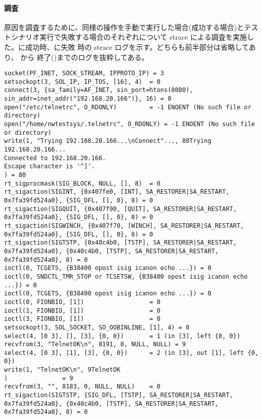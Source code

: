     \paragraph{調査}

原因を調査するために、同様の操作を手動で実行した場合(成功する場合)とテス
トシナリオ実行で失敗する場合のそれぞれについて strace による調査を実施し
た。に成功時、に失敗
時の strace ログを示す。どちらも前半部分は省略してあり、
から 終了()までのログを抜粋してある。

\begin{lstlisting}[caption=Telnet成功時(手動),label=lst:telnet-success,linebackgroundcolor={\ifnum\value{lstnumber}>22 \ifnum\value{lstnumber}<29\color{green!30}\fi\fi}]
socket(PF_INET, SOCK_STREAM, IPPROTO_IP) = 3
setsockopt(3, SOL_IP, IP_TOS, [16], 4)  = 0
connect(3, {sa_family=AF_INET, sin_port=htons(8080), sin_addr=inet_addr("192.168.20.166")}, 16) = 0
open("/etc/telnetrc", O_RDONLY)         = -1 ENOENT (No such file or directory)
open("/home/nwtestsys/.telnetrc", O_RDONLY) = -1 ENOENT (No such file or directory)
write(1, "Trying 192.168.20.166...\nConnect"..., 80Trying 192.168.20.166...
Connected to 192.168.20.166.
Escape character is '^]'.
) = 80
rt_sigprocmask(SIG_BLOCK, NULL, [], 8)  = 0
rt_sigaction(SIGINT, {0x407fe0, [INT], SA_RESTORER|SA_RESTART, 0x7fa39fd524a0}, {SIG_DFL, [], 0}, 8) = 0
rt_sigaction(SIGQUIT, {0x407f90, [QUIT], SA_RESTORER|SA_RESTART, 0x7fa39fd524a0}, {SIG_DFL, [], 0}, 8) = 0
rt_sigaction(SIGWINCH, {0x407f70, [WINCH], SA_RESTORER|SA_RESTART, 0x7fa39fd524a0}, {SIG_DFL, [], 0}, 8) = 0
rt_sigaction(SIGTSTP, {0x40c4b0, [TSTP], SA_RESTORER|SA_RESTART, 0x7fa39fd524a0}, {0x40c4b0, [TSTP], SA_RESTORER|SA_RESTART, 0x7fa39fd524a0}, 8) = 0
ioctl(0, TCGETS, {B38400 opost isig icanon echo ...}) = 0
ioctl(0, SNDCTL_TMR_STOP or TCSETSW, {B38400 opost isig icanon echo ...}) = 0
ioctl(0, TCGETS, {B38400 opost isig icanon echo ...}) = 0
ioctl(0, FIONBIO, [1])                  = 0
ioctl(1, FIONBIO, [1])                  = 0
ioctl(3, FIONBIO, [1])                  = 0
setsockopt(3, SOL_SOCKET, SO_OOBINLINE, [1], 4) = 0
select(4, [0 3], [], [3], {0, 0})       = 1 (in [3], left {0, 0})
recvfrom(3, "TelnetOK\n", 8191, 0, NULL, NULL) = 9
select(4, [0 3], [1], [3], {0, 0})      = 2 (in [3], out [1], left {0, 0})
write(1, "TelnetOK\n", 9TelnetOK
)               = 9
recvfrom(3, "", 8183, 0, NULL, NULL)    = 0
rt_sigaction(SIGTSTP, {SIG_DFL, [TSTP], SA_RESTORER|SA_RESTART, 0x7fa39fd524a0}, {0x40c4b0, [TSTP], SA_RESTORER|SA_RESTART, 0x7fa39fd524a0}, 8) = 0

\end{lstlisting}
